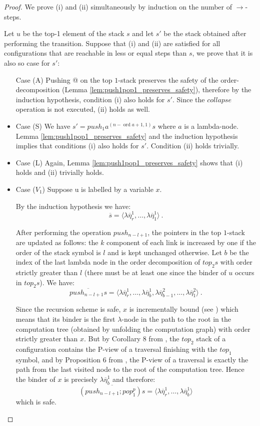 \documentclass{article}
\newcommand{\ord}{\mathop{\mathrm{ord}}}
\theoremstyle{remark}
\theoremstyle{definition}
\newcommand\orddec\overline
\begin{document}
\begin{proof}
We prove (i) and (ii) simultaneously by induction on the number of $\rightarrow$-steps.

Let $u$ be the top-1 element of the stack $s$ and let $s'$ be the
stack obtained after performing the transition. Suppose that (i) and
(ii) are satisfied for all configurations that are reachable in less
or equal steps than $s$, we prove that it is also so case for $s'$:
\begin{itemize}
\item[Case (A)] Pushing @ on the top $1$-stack preserves the safety of the
order-decomposition (Lemma
\ref{lem:push1pop1_preserves_safety}), therefore by the
induction hypothesis, condition (i) also holds for $s'$. Since
the $collapse$ operation is not executed, (ii) holds as well.

\item Case (S)
We have $s' = push_1 a^{(n-\ord{a}+1,1)} s$ where $a$ is a
lambda-node. Lemma \ref{lem:push1pop1_preserves_safety} and the
induction hypothesis implies that conditions (i) also holds for
$s'$. Condition (ii) holds trivially.

\item Case (L) Again, Lemma \ref{lem:push1pop1_preserves_safety}
shows that (i) holds and (ii) trivially holds.

\item Case ($V_1$) Suppose u is labelled by a variable $x$.

By the induction hypothesis we have:
$$ \orddec{s} = \langle \lambda \overline{\eta}_r^1
, \ldots,  \lambda \overline{\eta}_1^1   \rangle \ .$$


After performing the operation $push_{n-l+1}$, the pointers in
the top $1$-stack are updated as follows: the $k$ component of
each link is increased by one if the order of the stack symbol
is $l$ and is kept unchanged otherwise. Let $b$ be the index of
the last lambda node in the order decomposition of $top_2 s$
with order strictly greater than $l$ (there must be at least one
since the binder of $u$ occurs in $top_2 s$). We have:
$$ \orddec{push_{n-l+1} s} = \langle
\lambda \overline{\eta}_r^1
, \ldots,  \lambda \overline{\eta}_{b}^1, \lambda \overline{\eta}_{b-1}^2, \ldots,
 \lambda \overline{\eta}_1^2 \rangle
\ .$$


Since the recursion scheme is safe, $x$ is incrementally bound
 (see \cite{blumong:safelambdacalculus}) which means that its
 binder is the first $\lambda$-node in the path to the root in
 the computation tree (obtained by unfolding the computation
 graph) with order strictly greater than $x$. But by Corollary 8
 from \cite{hague-sto07}, the $top_2$ stack of a configuration
 contains the P-view of a traversal finishing with the $top_1$
 symbol, and by Proposition 6 from \cite{OngLics2006}, the
 P-view of a traversal is exactly the path from the last visited
 node to the root of the computation
tree. Hence the binder of $x$ is precisely $\lambda
\overline{\eta}_{b}^1$ and therefore:
$$ \orddec{(push_{n-l+1};pop_1^p) s} =
\langle \lambda \overline{\eta}_r^1, \ldots,  \lambda
\overline{\eta}_{b}^1 \rangle$$ which is safe.


\end{itemize}
\end{proof}
\end{document}
